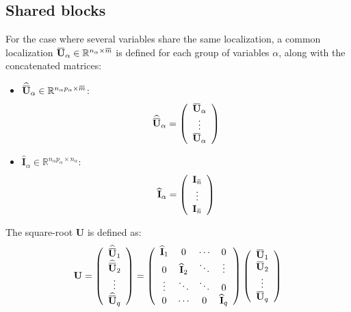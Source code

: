 \documentclass[12pt]{scrartcl}
\newcommand{\overbar}[1]{\mkern 1.5mu\overline{\mkern-1.5mu#1\mkern-1.5mu}\mkern 1.5mu}
\begin{document}
\subsection{Shared blocks}
For the case where several variables share the same localization, a common localization $\overbar{\mathbf{U}}_\alpha \in \mathbb{R}^{n_\alpha \times \overbar{m}}$ is defined for each group of variables $\alpha$, along with the concatenated matrices:
\begin{itemize}
\item $\widehat{\overbar{\mathbf{U}}}_\alpha \in \mathbb{R}^{n_\alpha p_\alpha \times \overbar{m}}$:
\begin{align}
\widehat{\overbar{\mathbf{U}}}_\alpha = \left( \begin{array}{c}
\overbar{\mathbf{U}}_\alpha\\
\vdots \\
\overbar{\mathbf{U}}_\alpha
\end{array} \right)
\end{align}
\item $\widehat{\mathbf{I}}_\alpha \in \mathbb{R}^{n_\alpha p_\alpha \times n_\alpha}$:
\begin{align}
\widehat{\mathbf{I}}_\alpha = \left( \begin{array}{c}
\mathbf{I}_{\overbar{n}}\\
\vdots \\
\mathbf{I}_{\overbar{n}}
\end{array} \right)
\end{align}
\end{itemize}
The square-root $\mathbf{U}$ is defined as:
\begin{align}
\mathbf{U} = \left( \begin{array}{c}
\widehat{\overbar{\mathbf{U}}}_1\\
\widehat{\overbar{\mathbf{U}}}_2 \\
\vdots \\
\widehat{\overbar{\mathbf{U}}}_q \\
\end{array} \right) = \left( \begin{array}{cccc}
\widehat{\mathbf{I}}_1 & 0 & \cdots & 0 \\
0 & \widehat{\mathbf{I}}_2 & \ddots & \vdots \\
\vdots & \ddots & \ddots & 0 \\
0 & \cdots & 0 & \widehat{\mathbf{I}}_q
\end{array} \right) \left( \begin{array}{c}
\overbar{\mathbf{U}}_1 \\
\overbar{\mathbf{U}}_2 \\
\vdots  \\
\overbar{\mathbf{U}}_q
\end{array} \right)
\end{align}
\end{document}
